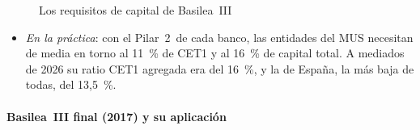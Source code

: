 \documentclass[11pt]{article}
\begin{document}
\begin{figure}[H]
\centering
\caption{Los requisitos de capital de Basilea~III}\label{fig:requisitos-capital}
\end{figure}

\begin{itemize}
\item \emph{En la práctica}: con el Pilar~2~de cada banco, las entidades del MUS necesitan de media en torno al 11~\% de CET1 y al 16~\% de capital total\nocite{BCE2025SREP}. A mediados de 2026 su ratio CET1 agregada era del 16~\%, y la de España, la más baja de todas, del 13,5~\%\nocite{BCE2026SupervisionSI}.
\end{itemize}

\paragraph{Basilea~III final (2017) y su aplicación}
\end{document}

